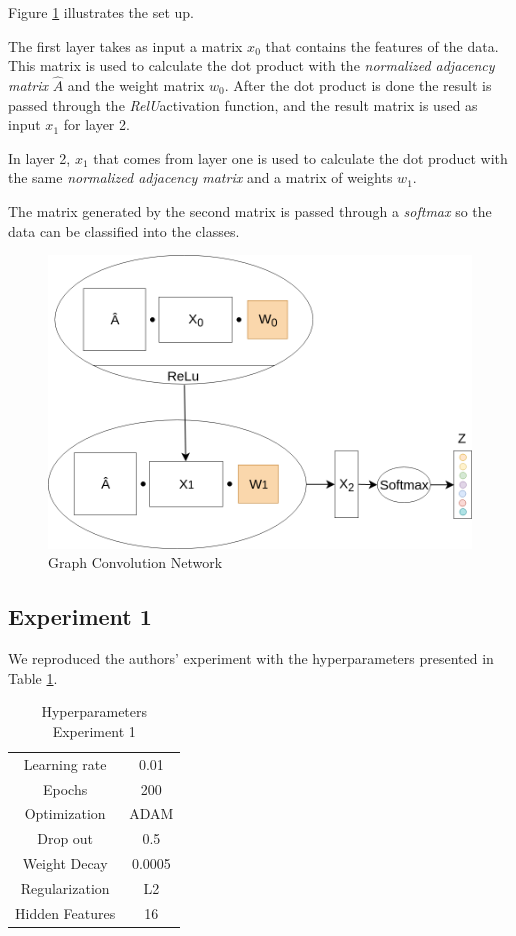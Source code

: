 Figure \ref{fig:model} illustrates the set up.

The first layer takes as input a matrix $x_{0}$ that contains the features of the data. This matrix is used to calculate the dot product with the \textit{normalized adjacency matrix} $\hat{A}$ and the weight matrix $w_{0}$. After the dot product is done the result is passed through the \textit{RelU}activation function, and the result matrix is used as input $x_{1}$ for layer 2.

In layer 2, $x_{1}$ that comes from layer one is used to calculate the dot product with the same \textit{normalized adjacency matrix} and a matrix of weights $w_{1}$.

The matrix generated by the second matrix is passed through a \textit{softmax} so the data can be classified into the classes.

\begin{figure}[h!]
  \centering
  \includegraphics[width=0.8\linewidth]{media/model_right.png}
  \caption{Graph Convolution Network}
  \label{fig:model}
\end{figure}

\subsection{Experiment 1}

We reproduced the authors' experiment with the hyperparameters presented in Table \ref{tab:hyperparameters1}.

\begin {table}[ht]
\caption {Hyperparameters Experiment 1} \label{tab:hyperparameters1} 
  \begin{center}
    \begin{tabular}{|c|c|}
    \hline
    Learning rate     & 0.01 \\ 
    Epochs            & 200  \\ 
    Optimization      & ADAM \\
    Drop out          & 0.5   \\
    Weight Decay      & 0.0005 \\
    Regularization    & L2    \\
    Hidden Features   & 16    \\
    \hline
    \end{tabular}
  \end{center}
\end{table}

